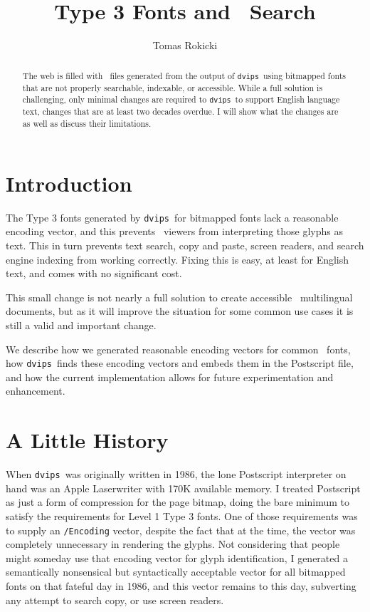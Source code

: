 \documentclass{ltugboat}
\title{Type 3 Fonts and \PDF\ Search}
\author{Tomas Rokicki}
\def\PDF{\acro{PDF}}
\def\dvips{\texttt{dvips}}
\begin{document}
\maketitle

\begin{abstract}
The web is filled with \PDF\ files generated from the output of
\dvips\ using bitmapped fonts that are not properly searchable,
indexable, or accessible.  While a full solution is challenging,
only minimal changes are required to \dvips\ to support
English language text, changes that are at least two decades overdue.
I will show what the changes are as well as discuss their
limitations.
\end{abstract}

\section{Introduction}

The Type 3 fonts generated by \dvips\ for bitmapped fonts
lack a reasonable encoding vector, and this prevents \PDF\ 
viewers from interpreting those glyphs as text.  This in turn
prevents text search, copy and paste, screen readers, and
search engine indexing from working correctly.  Fixing this is
easy, at least for English text, and comes with no significant
cost.

This small change is not nearly a full solution to create
accessible \PDF\ multilingual documents, but as it will
improve the situation for some common use cases it is still
a valid and important change.

We describe how we generated reasonable encoding vectors
for common \MF\ fonts, how \dvips\ finds these
encoding vectors and embeds them in the Postscript file, and
how the current implementation allows for future
experimentation and enhancement.

\section{A Little History}

When \dvips\ was originally written in 1986, the lone
Postscript interpreter on hand was an Apple Laserwriter with
170K available memory.  I treated Postscript as just a form of
compression for the page bitmap, doing the bare minimum to
satisfy the requirements for Level 1 Type 3 fonts.  One of
those requirements was to supply an \texttt{/Encoding} vector,
despite the fact that at the time, the vector was completely
unnecessary in rendering the glyphs.  Not considering that people
might someday use that encoding vector for glyph identification,
I generated a semantically nonsensical but syntactically acceptable
vector for all bitmapped fonts on that fateful day in 1986, and
this vector remains to this day, subverting any attempt to search
copy, or use screen readers.
\end{document}

